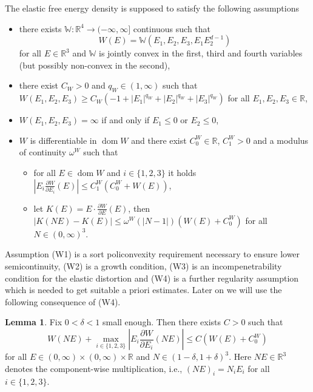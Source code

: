 \documentclass[a4paper,10pt,twoside]{amsbook}
\numberwithin{section}{chapter}
\numberwithin{equation}{chapter}
\theoremstyle{definition}
\newtheorem{lemma}[prop]{Lemma}
\DeclareMathOperator{\dom}{dom}
\newcommand{\dind}[2]{\frac{\partial #1}{\partial #2}}
\begin{document}
The elastic free energy density is supposed to satisfy the following assumptions
\begin{itemize}[itemsep=1em]
\item[(W1)] there exists $\mathbb{W}\colon\mathbb{R}^4\to(-\infty,\infty]$ continuous such that
\[
W(E)=\mathbb{W}(E_1,E_2,E_3,E_1E_2^{d-1})
\]
for all $E\in\mathbb{R}^3$ and $\mathbb{W}$ is jointly convex in the first, third and fourth variables (but possibly non-convex in the second),
\item[(W2)] there exist $C_W>0$ and $q_W\in(1,\infty)$ such that $W(E_1,E_2,E_3)\ge C_W(-1+|E_1|^{q_W}+|E_2|^{q_W}+|E_3|^{q_W})$ for all $E_1,E_2,E_3\in\mathbb{R}$,
\item[(W3)] $W(E_1,E_2,E_3)=\infty$ if and only if $E_1\le0$ or $E_2\le0$,
\item[(W4)] $W$ is differentiable in $\dom W$ and there exist $C^W_0\in\mathbb{R}$, $C^W_1>0$ and a modulus of continuity $\omega^W$ such that
\begin{itemize}
\item[(i)] for all $E\in\dom W$ and $i\in\{1,2,3\}$ it holds $\left|E_i\dind{W}{E_i}(E)\right|\le C_1^W(C_0^W+W(E))$,
\item[(ii)] let $K(E)=E\cdot\dind{W}{E}(E)$, then $|K(NE)-K(E)|\le\omega^W(|N-1|)(W(E)+C_0^W)$ for all $N\in(0,\infty)^3$.
\end{itemize}
\end{itemize}
Assumption (W1) is a sort policonvexity requirement necessary to ensure lower semicontinuity, (W2) is a growth condition, (W3) is an incompenetrability condition for the elastic distortion and (W4) is a further regularity assumption which is needed to get suitable a priori estimates. Later on we will use the following consequence of (W4).
\begin{lemma}
\label{lemma:tipo-ball-kirchhoff-control}
Fix $0<\delta<1$ small enough. Then there exists $C>0$ such that
\[
W(NE)+\max_{i\in\{1,2,3\}}\left|E_i\dind{W}{E_i}(NE)\right|\le C(W(E)+C_0^W)
\]
for all $E\in(0,\infty)\times(0,\infty)\times\mathbb{R}$ and $N\in(1-\delta,1+\delta)^3$. Here $NE\in\mathbb{R}^3$ denotes the component-wise multiplication, i.e., $(NE)_i=N_iE_i$ for all $i\in\{1,2,3\}$.
\end{lemma}
\end{document}
